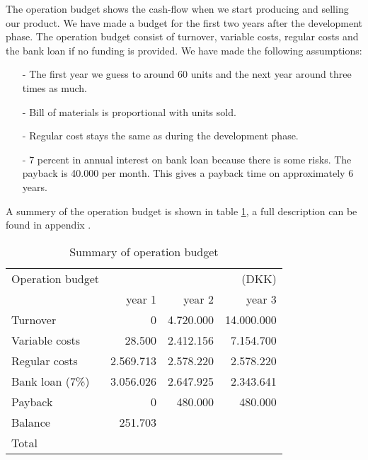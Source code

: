 The operation budget shows the cash-flow when we start producing and selling our product. We have made a budget for the first two years after the development phase. The operation budget consist of turnover, variable costs, regular costs and the bank loan if no funding is provided. We have made the following assumptions:
\begin{itemize}
\item[-] The first year we guess to around 60 units and the next year around three times as much.
\item[-] Bill of materials is proportional with units sold.
\item[-] Regular cost stays the same as during the development phase.
\item[-] 7 percent in annual interest on bank loan because there is some risks. The payback is 40.000 per month. This gives a payback time on approximately 6 years.
\end{itemize}
A summery of the operation budget is shown in table \ref{opebud}, a full description can be found in appendix .
\begin{table}[h!]
\centering
\begin{tabular}{l r r r}
Operation budget      &           &           & (DKK)      \\
                      & year 1    & year 2    & year 3     \\
\hline                
Turnover              &         0 & 4.720.000 & 14.000.000 \\
Variable costs        &    28.500 & 2.412.156 &  7.154.700 \\
Regular costs         & 2.569.713 & 2.578.220 &  2.578.220 \\
Bank loan (7\%)       & 3.056.026 & 2.647.925 &  2.343.641 \\
Payback               &         0 &   480.000 &    480.000 \\
Balance               &   251.703 &           &            \\  
\hline                                                      
Total                 &           &           &            \\
\end{tabular}
\caption{Summary of operation budget}
\label{opebud}
\end{table}
